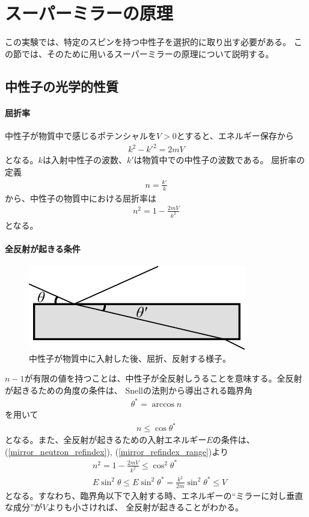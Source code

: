 \section{スーパーミラーの原理}\label{mirror_sec}
\nocite{neutron_spin_optics}
この実験では、特定のスピンを持つ中性子を選択的に取り出す必要がある。
この節では、そのために用いるスーパーミラーの原理について説明する。

\subsection{中性子の光学的性質}
\paragraph{屈折率}
中性子が物質中で感じるポテンシャルを$V>0$とすると、エネルギー保存から
\begin{align}
k^2-k'^2=2mV
\end{align}
となる。$k$は入射中性子の波数、$k'$は物質中での中性子の波数である。
屈折率の定義
\begin{align}
n=\frac{k'}{k}
\end{align}
から、中性子の物質中における屈折率は
\begin{align}
n^2=1-\frac{2mV}{k^2}\label{mirror_neutron_refindex}
\end{align}
となる。

\paragraph{全反射が起きる条件}\label{mirrir_perfect_reflection}
\begin{figure}[h]
\centering
\includegraphics{mirror/reflect.pdf}
\caption{中性子が物質中に入射した後、屈折、反射する様子。}
\end{figure}
$n-1$が有限の値を持つことは、中性子が全反射しうることを意味する。全反射が起きるための角度の条件は、
Snellの法則から導出される臨界角
\begin{align}
\theta^*=\arccos{n}
\end{align}
を用いて
\begin{align}
n\leq\cos\theta^* \label{mirror_refindex_range}
\end{align}
となる。また、全反射が起きるための入射エネルギー$E$の条件は、(\ref{mirror_neutron_refindex}), (\ref{mirror_refindex_range})より
\begin{align}
&n^2=1-\frac{2mV}{k^2}\leq\cos^2\theta^*\\
&E\sin^2\theta\leq E\sin^2\theta^*=\frac{k^2}{2m}\sin^2\theta^*\leq V\label{total_reflection_condition}
\end{align}
となる。すなわち、臨界角以下で入射する時、エネルギーの``ミラーに対し垂直な成分''が$V$よりも小さければ、
全反射が起きることがわかる。

